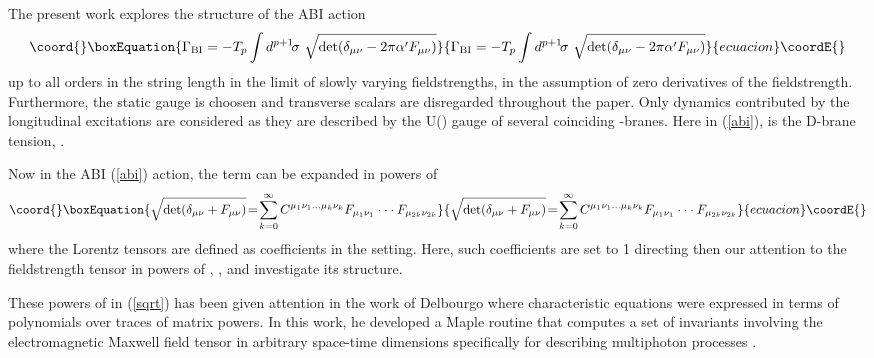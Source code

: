 \documentclass[a4paper,twocolumn]{article}
\begin{document}
The present work explores the structure of the ABI action
\cite{sev}
\begin{equation}\coord{}\boxEquation{\label{abi}
    \Gamma_{\mathrm{BI}}
    =-T_p\int d^{p+1}\!\sigma\,\,
    \sqrt{
        \det(
            \delta_{{\mu}{\nu}}-2\pi\alpha'F_{{\mu}{\nu}})}
}{\Gamma_{\mathrm{BI}}
    =-T_p\int d^{p+1}\!\sigma\,\,
    \sqrt{
        \det(
            \delta_{{\mu}{\nu}}-2\pi\alpha'F_{{\mu}{\nu}})}
}{ecuacion}\coordE{}\end{equation}
up to all orders in the string length \coordHE{} in the
limit of slowly varying fieldstrengths, in the assumption of zero
derivatives of the fieldstrength. Furthermore, the static gauge is
choosen and transverse scalars are disregarded throughout the
paper. Only dynamics contributed by the longitudinal excitations
are considered as they are described by the U(\coordHE{}) gauge of \coordHE{}
several coinciding \coordHE{}-branes. Here in (\ref{abi}), \coordHE{} is the
D\coordHE{}-brane tension, \coordHE{}.

Now in the ABI (\ref{abi}) action, the term can be expanded in
powers of \coordHE{} \cite{tsey}
\begin{equation}\coord{}\boxEquation{\label{sqrt}
    \sqrt{
        \det(
            \delta_{{\mu}{\nu}}+F_{{\mu}{\nu}})}
    \!=\!\sum^\infty_{k=0}
    C^{\mu_1\nu_1\ldots\mu_k\nu_k}F_{\mu_1\nu_1}\cdot\cdot\cdot F_{\mu_{2k}\nu_{2k}}
}{\sqrt{
        \det(
            \delta_{{\mu}{\nu}}+F_{{\mu}{\nu}})}
    \!=\!\sum^\infty_{k=0}
    C^{\mu_1\nu_1\ldots\mu_k\nu_k}F_{\mu_1\nu_1}\cdot\cdot\cdot F_{\mu_{2k}\nu_{2k}}
}{ecuacion}\coordE{}\end{equation}
 where the Lorentz tensors
\coordHE{}  are defined as coefficients in
the \coordHE{} setting. Here, such coefficients are set to 1
directing then our attention to the fieldstrength tensor in powers
of \coordHE{}, \coordHE{}, and investigate its structure.

These powers of \coordHE{} in (\ref{sqrt}) has been given attention in
the work of Delbourgo \cite{delb} where characteristic equations
were expressed in terms of polynomials over traces of matrix
powers. In this work, he developed a Maple routine that computes a
set of invariants involving the electromagnetic Maxwell field
tensor in arbitrary space-time dimensions specifically for
describing multiphoton processes \cite{ritz}.
\end{document}
